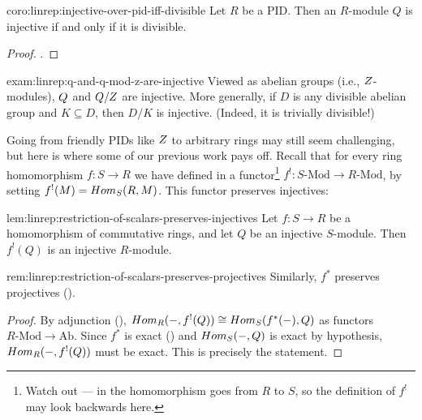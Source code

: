 \begin{coro}{}{coro:linrep:injective-over-pid-iff-divisible}
  Let $R$ be a PID. Then an $R$-module $Q$ is injective if and only if
  it is divisible.
\end{coro}

\begin{proof}
  .
\end{proof}

\begin{exam}{}{exam:linrep:q-and-q-mod-z-are-injective}
  Viewed as abelian groups (i.e., $Z$-modules), $Q$ and $Q/Z$ are
  injective. More generally, if $D$ is any divisible abelian group and
  $K \subseteq D$, then $D/K$ is injective. (Indeed, it is trivially
  divisible!)
\end{exam}
Going from friendly PIDs like $Z$ to arbitrary rings may still seem
challenging, but here is where some of our previous work pays
off. Recall that for every ring homomorphism $f : S \to R$ we have
defined in
 a
functor\footnote{Watch out --- in
   the
  homomorphism goes from $R$ to $S$, so the definition of $f^!$ may
  look backwards here.}  $f^! : S\text{-Mod} \to R\text{-Mod}$, by
setting $f^!(M) = Hom_S(R, M)$. This functor preserves injectives:

\begin{lem}{}{lem:linrep:restriction-of-scalars-preserves-injectives}
  Let $f : S \to R$ be a homomorphism of commutative rings, and let
  $Q$ be an injective $S$-module. Then $f^!(Q)$ is an injective
  $R$-module.
\end{lem}

\begin{rem}{}{rem:linrep:restriction-of-scalars-preserves-projectives}
  Similarly, $f^*$ preserves projectives
  ().
\end{rem}

\begin{proof}
  By adjunction (),
  $Hom_R(-, f^!(Q)) \cong Hom_S(f^*(-), Q)$ as functors
  $R\text{-Mod} \to \mathrm{Ab}$. Since $f^*$ is exact
  () and $Hom_S(-, Q)$ is exact by
  hypothesis, $Hom_R(-, f^!(Q))$ must be exact.  This is precisely
  the statement.
\end{proof}

